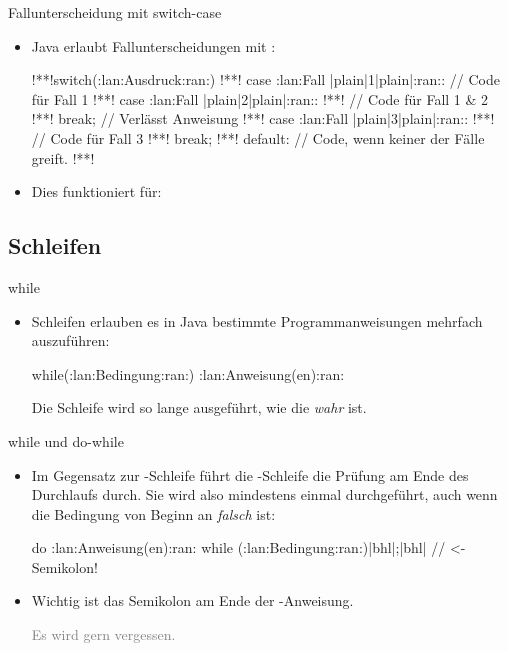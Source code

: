 \begin{frame}[fragile]{Fallunterscheidung mit switch-case}
    \begin{itemize}[<+(1)->]
        \item Java erlaubt Fallunterscheidungen mit :\pause{}
\begin{plainjava}
!**!switch(:lan:Ausdruck:ran:){
!**!    case :lan:Fall |plain|1|plain|:ran:: // Code für Fall 1
!**!    case :lan:Fall |plain|2|plain|:ran::
!**!        // Code für Fall 1 & 2
!**!        break; // Verlässt Anweisung
!**!    case :lan:Fall |plain|3|plain|:ran::
!**!        // Code für Fall 3
!**!        break;
!**!    default: // Code, wenn keiner der Fälle greift.
!**!}
\end{plainjava}
    \item<10-> Dies funktioniert für: 
    \end{itemize}
\end{frame}

\subsection{Schleifen}

\begin{frame}[fragile]{while}
    \begin{itemize}[<+(1)->]
        \item Schleifen erlauben es in Java bestimmte Programmanweisungen mehrfach auszuführen:\pause{}
        \begin{plainjava}
while(:lan:Bedingung:ran:) {
    :lan:Anweisung(en):ran:
}
        \end{plainjava}
        \pause{}Die Schleife wird so lange ausgeführt, wie die  \emph{wahr} ist.
    \end{itemize}
\end{frame}

\begin{frame}[fragile]{while und do-while}
    \begin{itemize}[<+(1)->]
        \item Im Gegensatz zur -Schleife führt die -Schleife die Prüfung am Ende des Durchlaufs durch.\pause{} Sie wird also mindestens einmal durchgeführt,\pause{} auch wenn die Bedingung von Beginn an \emph{falsch} ist:
        \begin{plainjava}
do {
    :lan:Anweisung(en):ran:
} while (:lan:Bedingung:ran:)|bhl|;|bhl| // <- Semikolon!
        \end{plainjava}
        \item Wichtig ist das Semikolon am Ende der -Anweisung.\par \textcolor{gray}{Es wird gern vergessen.}
    \end{itemize}
\end{frame}

